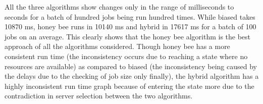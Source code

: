 All the three algorithms show changes only in the range of milliseconds to seconds for a batch of hundred jobs being run hundred times. While biased takes 10870 ms, honey bee runs in 10140 ms and hybrid in 17617 ms for a batch of 100 jobs on an average. This clearly shows that the honey bee algorithm is the best approach of all the algorithms considered. Though honey bee has a more consistent run time (the inconsistency occurs due to reaching a state where no resources are available) as compared to biased (the inconsistency being caused by the delays due to the checking of job size only finally), the hybrid algorithm has a highly inconsistent run time graph because of entering the state more due to the contradiction in server selection between the two algorithms.
